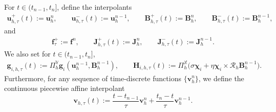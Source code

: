 \documentclass[11pt, reqno]{amsart}
\theoremstyle{definition}
\numberwithin{equation}{section}
\newcommand{\bff}{\boldsymbol}
\newcommand{\bb}{\mathbb}
\begin{document}
For $t\in(t_{n-1},t_n]$, define the interpolants
\begin{align}\label{equ:conv interpolants}
	\bff{u}_{h,\tau}^{+}(t):=\bff{u}_h^n,\qquad \bff{u}_{h,\tau}^{-}(t):=\bff{u}_h^{n-1},\qquad
	\bff{B}_{h,\tau}^{+}(t):=\bff{B}_h^n,\qquad 
	\bff{B}_{h,\tau}^{-}(t):=\bff{B}_h^{n-1},
\end{align}
and
\begin{align}\label{equ:conv interpolants J}
	\bff{f}_\tau^+ := \bff{f}^n, \qquad
	\bff{J}_{h,\tau}^{+}(t):=\bff{J}_h^n,\qquad \bff{J}_{h,\tau}^{-}(t):=\bff{J}_h^{n-1}.
\end{align}
We also set for $t\in(t_{n-1},t_n]$,
\begin{align}\label{equ:conv noise coefficients}
	\bff{g}_{i,h,\tau}(t):= \Pi_h^{\bb{V}} \bff{g}_i(\bff{u}_h^{n-1},\bff{B}_h^{n-1}),\qquad
	\bff{H}_{i,h,\tau}(t):= \Pi_h^{\bb{X}}\bigl(\sigma\bff{\chi}_i+\eta\bff{\chi}_i\times\mathcal{R}_h\bff{B}_h^{n-1}\bigr).
\end{align}
Furthermore, for any sequence of time-discrete functions $\{\bff{v}_h^n\}$, we define the continuous piecewise affine interpolant
\[
\bff v_{h,\tau}(t)
:=
\frac{t-t_{n-1}}{\tau}\bff v_h^n+\frac{t_n-t}{\tau}\bff v_h^{n-1}.
\]
\end{document}
